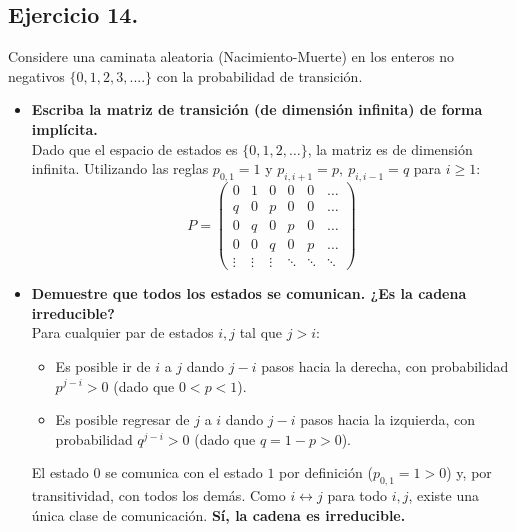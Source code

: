 \documentclass[10pt,a4paper]{book}
\begin{document}
\newpage

\subsection*{Ejercicio 14.} Considere una caminata aleatoria (Nacimiento-Muerte) en los enteros no negativos \( \{0,1,2,3,.... \}\)
con la probabilidad de transición.

\vspace{0.2cm}

\begin{itemize}
    \item[\textbf{a)}] \textbf{Escriba la matriz de transición (de dimensión infinita) de forma implícita.} \\
    Dado que el espacio de estados es $\{0, 1, 2, \dots\}$, la matriz es de dimensión infinita. Utilizando las reglas $p_{0,1} = 1$ y $p_{i,i+1} = p, \ p_{i,i-1} = q$ para $i \ge 1$:
    \[ P = \begin{pmatrix} 
    0 & 1 & 0 & 0 & 0 & \dots \\ 
    q & 0 & p & 0 & 0 & \dots \\ 
    0 & q & 0 & p & 0 & \dots \\ 
    0 & 0 & q & 0 & p & \dots \\ 
    \vdots & \vdots & \vdots & \ddots & \ddots & \ddots 
    \end{pmatrix} \]

    \item[\textbf{b)}] \textbf{Demuestre que todos los estados se comunican. ¿Es la cadena irreducible?} \\
    Para cualquier par de estados $i, j$ tal que $j > i$:
    \begin{itemize}
        \item Es posible ir de $i$ a $j$ dando $j-i$ pasos hacia la derecha, con probabilidad $p^{j-i} > 0$ (dado que $0 < p < 1$).
        \item Es posible regresar de $j$ a $i$ dando $j-i$ pasos hacia la izquierda, con probabilidad $q^{j-i} > 0$ (dado que $q = 1-p > 0$).
    \end{itemize}
    El estado $0$ se comunica con el estado $1$ por definición ($p_{0,1} = 1 > 0$) y, por transitividad, con todos los demás. Como $i \leftrightarrow j$ para todo $i, j$, existe una única clase de comunicación. \textbf{Sí, la cadena es irreducible.}


\end{itemize}
\end{document}
